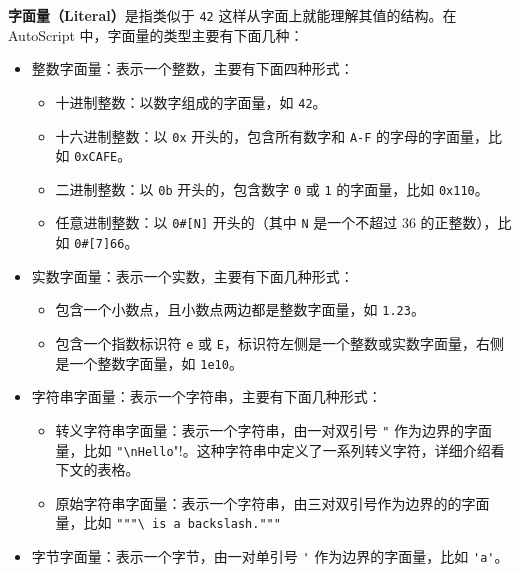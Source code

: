 \textbf{字面量（Literal）}是指类似于 \lstinline!42! 这样从字面上就能理解其值的结构。在 AutoScript 中，字面量的类型主要有下面几种：

\begin{itemize}
    \item 整数字面量：表示一个整数，主要有下面四种形式：
    \begin{itemize}
        \item 十进制整数：以数字组成的字面量，如 \lstinline!42!。
        
        \item 十六进制整数：以 \lstinline!0x! 开头的，包含所有数字和 \lstinline!A-F! 的字母的字面量，比如 \lstinline!0xCAFE!。

        \item 二进制整数：以 \lstinline!0b! 开头的，包含数字 \lstinline!0! 或 \lstinline!1! 的字面量，比如 \lstinline!0x110!。
        
        \item 任意进制整数：以 \lstinline!0#[N]! 开头的（其中 \lstinline!N! 是一个不超过 36 的正整数），比如 \lstinline!0#[7]66!。
    \end{itemize}

    \item 实数字面量：表示一个实数，主要有下面几种形式：
    \begin{itemize}
        \item 包含一个小数点，且小数点两边都是整数字面量，如 \lstinline!1.23!。

        \item 包含一个指数标识符 \lstinline!e! 或 \lstinline!E!，标识符左侧是一个整数或实数字面量，右侧是一个整数字面量，如 \lstinline!1e10!。
    \end{itemize}
    
    \item 字符串字面量：表示一个字符串，主要有下面几种形式：
    \begin{itemize}
     	\item 转义字符串字面量：表示一个字符串，由一对双引号 \lstinline!"! 作为边界的字面量，比如 \lstinline!"\nHello!"!。这种字符串中定义了一系列转义字符，详细介绍看下文的表格。

    	\item 原始字符串字面量：表示一个字符串，由三对双引号作为边界的的字面量，比如 \lstinline!"""\ is a backslash."""!
    \end{itemize}

    \item 字节字面量：表示一个字节，由一对单引号 \lstinline!'! 作为边界的字面量，比如 \lstinline!'a'!。


\end{itemize}
